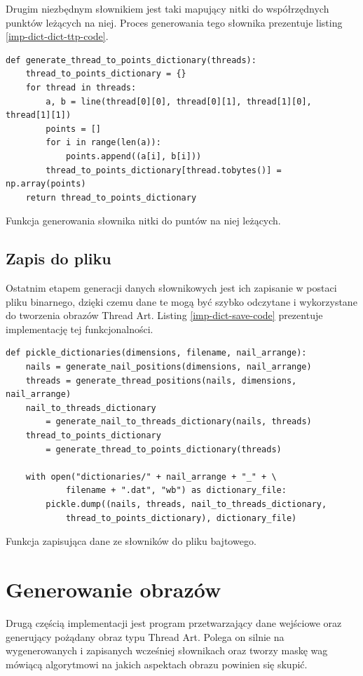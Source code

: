 \documentclass[a4paper, 12pt, polish, twoside]{extreport}
\begin{document}
        Drugim niezbędnym słownikiem jest taki mapujący nitki do współrzędnych punktów leżących na niej. Proces generowania tego słownika prezentuje listing \ref{imp-dict-dict-ttp-code}.
        \begin{code}[H]
        \begin{verbatim}
def generate_thread_to_points_dictionary(threads):
    thread_to_points_dictionary = {}
    for thread in threads:
        a, b = line(thread[0][0], thread[0][1], thread[1][0], thread[1][1])
        points = []
        for i in range(len(a)):
            points.append((a[i], b[i]))
        thread_to_points_dictionary[thread.tobytes()] = np.array(points)
    return thread_to_points_dictionary
        \end{verbatim}
        \caption{Funkcja generowania słownika nitki do puntów na niej leżących.}
        \label{imp-dict-dict-ttp-code}
        \end{code}
        
        \subsection{Zapis do pliku} \label{imp-dict-save}
        Ostatnim etapem generacji danych słownikowych jest ich zapisanie w postaci pliku binarnego, dzięki czemu dane te mogą być szybko odczytane i wykorzystane do tworzenia obrazów Thread Art. Listing \ref{imp-dict-save-code} prezentuje implementację tej funkcjonalności.
        \begin{code}[H]
        \begin{verbatim}
def pickle_dictionaries(dimensions, filename, nail_arrange):
    nails = generate_nail_positions(dimensions, nail_arrange)
    threads = generate_thread_positions(nails, dimensions, nail_arrange)
    nail_to_threads_dictionary 
        = generate_nail_to_threads_dictionary(nails, threads)
    thread_to_points_dictionary 
        = generate_thread_to_points_dictionary(threads)

    with open("dictionaries/" + nail_arrange + "_" + \
            filename + ".dat", "wb") as dictionary_file:
        pickle.dump((nails, threads, nail_to_threads_dictionary, 
            thread_to_points_dictionary), dictionary_file)
        \end{verbatim}
        \caption{Funkcja zapisująca dane ze słowników do pliku bajtowego.}
        \label{imp-dict-save-code}
        \end{code}
        
    \section{Generowanie obrazów} \label{imp-art}
    Drugą częścią implementacji jest program przetwarzający dane wejściowe oraz generujący pożądany obraz typu Thread Art. Polega on silnie na wygenerowanych i zapisanych wcześniej słownikach oraz tworzy maskę wag mówiącą algorytmowi na jakich aspektach obrazu powinien się skupić.
        \newpage
\end{document}
